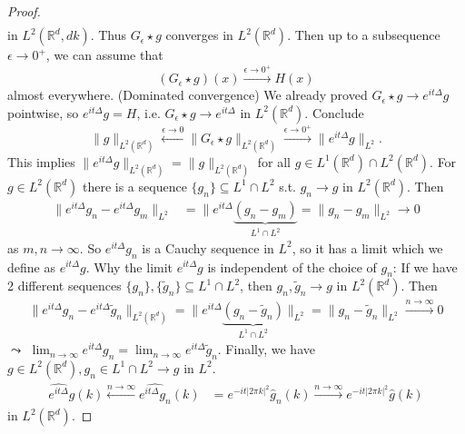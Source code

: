 \documentclass{report}
\theoremstyle{tommy}
\begin{document}
\begin{proof}
\begin{align*}
    \end{align*}
    in \(L^2(\mathbb{R}^d, dk)\). Thus \(G_\epsilon \star g\) converges in \(L^2(\mathbb{R}^d)\). Then up to a subsequence \(\epsilon \to 0^+\), we can assume that 
    \[(G_\epsilon \star g)(x) \xrightarrow{\epsilon \to 0^+} H(x) \]
    almost everywhere. (Dominated convergence) We already proved \(G_\epsilon \star g \to e^{it \Delta} g\) pointwise, so \(e^{it \Delta} g = H\), i.e. \(G_\epsilon \star g \to e^{it \Delta}\) in \(L^2(\mathbb{R}^d)\). Conclude 
    \[\|g\|_{L^2(\mathbb{R}^d)} \xleftarrow{\epsilon \to 0} \|G_\epsilon \star g\|_{L^2(\mathbb{R}^d)} \xrightarrow{\epsilon \to 0^+} \|e^{it \Delta} g \|_{L^2}.\]
    This implies \(\|e^{it\Delta} g\|_{L^2(\mathbb{R}^d)} = \|g\|_{L^2(\mathbb{R}^d)}\) for all \(g \in L^1(\mathbb{R}^d) \cap L^2(\mathbb{R}^d)\). For \(g \in L^2(\mathbb{R}^d)\) there is a sequence \(\{g_n\} \subseteq L^1 \cap L^2\) s.t. \(g_n \to g\) in \(L^2(\mathbb{R}^d)\). Then 
    \begin{align*}
      \|e^{it \Delta} g_n - e^{ it \Delta} g_m \|_{L^2} &= \|e^{it \Delta} \underbrace{(g_n - g_m)}_{L^1 \cap L^2} = \|g_n - g_m\|_{L^2} \to 0
    \end{align*}
    as \(m,n \to \infty\). So \(e^{it \Delta} g_n\) is a Cauchy sequence in \(L^2\), so it has a limit which we define as \(e^{i t \Delta} g\). Why the limit \(e^{it\Delta} g\) is independent of the choice of \(g_n\): If we have 2 different sequences \(\{g_n\}, \{\tilde g_n\} \subseteq L^1 \cap L^2\), then \(g_n, \tilde g_n \to g\) in \(L^2(\mathbb{R}^d)\). Then
    \begin{align*}
      \|e^{it \Delta} g_n - e^{it \Delta} \tilde g_n\|_{L^2(\mathbb{R}^d)} = \|e^{it \Delta} \underbrace{(g_n - \tilde g_n)}_{L^1 \cap L^2}\|_{L^2} = \|g_n - \tilde g_n\|_{L^2} \xrightarrow{n \to \infty} 0
    \end{align*}
    \(\leadsto\) \(\lim_{n \to \infty} e^{it \Delta} g_n = \lim_{n \to \infty} e^{it\Delta}\tilde g_n\). Finally, we have \(g \in L^2(\mathbb{R}^d), g_n \in L^1 \cap L^2 \to g\) in \(L^2\).
    \begin{align*}
      \widehat{e^{it \Delta}}g(k)\xleftarrow{n \to \infty} \widehat{e^{it \Delta} g_n} (k) &= e^{-it |2 \pi k|^2} \hat g_n (k) \xrightarrow{n \to \infty} e^{-it |2 \pi k|^2} \hat g(k)
    \end{align*}
    in \(L^2(\mathbb{R}^d)\).
  \end{proof}
\end{document}
